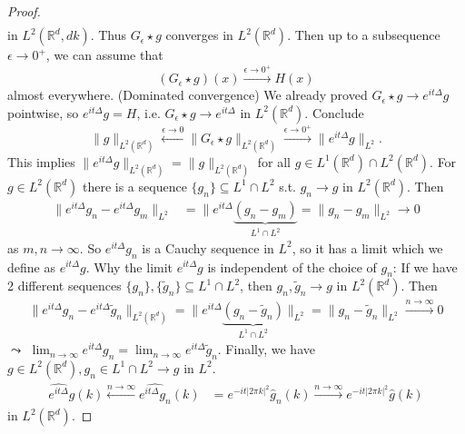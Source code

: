 \documentclass{report}
\theoremstyle{tommy}
\begin{document}
\begin{proof}
\begin{align*}
    \end{align*}
    in \(L^2(\mathbb{R}^d, dk)\). Thus \(G_\epsilon \star g\) converges in \(L^2(\mathbb{R}^d)\). Then up to a subsequence \(\epsilon \to 0^+\), we can assume that 
    \[(G_\epsilon \star g)(x) \xrightarrow{\epsilon \to 0^+} H(x) \]
    almost everywhere. (Dominated convergence) We already proved \(G_\epsilon \star g \to e^{it \Delta} g\) pointwise, so \(e^{it \Delta} g = H\), i.e. \(G_\epsilon \star g \to e^{it \Delta}\) in \(L^2(\mathbb{R}^d)\). Conclude 
    \[\|g\|_{L^2(\mathbb{R}^d)} \xleftarrow{\epsilon \to 0} \|G_\epsilon \star g\|_{L^2(\mathbb{R}^d)} \xrightarrow{\epsilon \to 0^+} \|e^{it \Delta} g \|_{L^2}.\]
    This implies \(\|e^{it\Delta} g\|_{L^2(\mathbb{R}^d)} = \|g\|_{L^2(\mathbb{R}^d)}\) for all \(g \in L^1(\mathbb{R}^d) \cap L^2(\mathbb{R}^d)\). For \(g \in L^2(\mathbb{R}^d)\) there is a sequence \(\{g_n\} \subseteq L^1 \cap L^2\) s.t. \(g_n \to g\) in \(L^2(\mathbb{R}^d)\). Then 
    \begin{align*}
      \|e^{it \Delta} g_n - e^{ it \Delta} g_m \|_{L^2} &= \|e^{it \Delta} \underbrace{(g_n - g_m)}_{L^1 \cap L^2} = \|g_n - g_m\|_{L^2} \to 0
    \end{align*}
    as \(m,n \to \infty\). So \(e^{it \Delta} g_n\) is a Cauchy sequence in \(L^2\), so it has a limit which we define as \(e^{i t \Delta} g\). Why the limit \(e^{it\Delta} g\) is independent of the choice of \(g_n\): If we have 2 different sequences \(\{g_n\}, \{\tilde g_n\} \subseteq L^1 \cap L^2\), then \(g_n, \tilde g_n \to g\) in \(L^2(\mathbb{R}^d)\). Then
    \begin{align*}
      \|e^{it \Delta} g_n - e^{it \Delta} \tilde g_n\|_{L^2(\mathbb{R}^d)} = \|e^{it \Delta} \underbrace{(g_n - \tilde g_n)}_{L^1 \cap L^2}\|_{L^2} = \|g_n - \tilde g_n\|_{L^2} \xrightarrow{n \to \infty} 0
    \end{align*}
    \(\leadsto\) \(\lim_{n \to \infty} e^{it \Delta} g_n = \lim_{n \to \infty} e^{it\Delta}\tilde g_n\). Finally, we have \(g \in L^2(\mathbb{R}^d), g_n \in L^1 \cap L^2 \to g\) in \(L^2\).
    \begin{align*}
      \widehat{e^{it \Delta}}g(k)\xleftarrow{n \to \infty} \widehat{e^{it \Delta} g_n} (k) &= e^{-it |2 \pi k|^2} \hat g_n (k) \xrightarrow{n \to \infty} e^{-it |2 \pi k|^2} \hat g(k)
    \end{align*}
    in \(L^2(\mathbb{R}^d)\).
  \end{proof}
\end{document}
